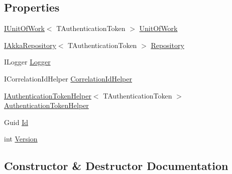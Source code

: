 \subsection*{Properties}
\begin{DoxyCompactItemize}
\item 
\hyperlink{interfaceCqrs_1_1Domain_1_1IUnitOfWork}{I\+Unit\+Of\+Work}$<$ T\+Authentication\+Token $>$ \hyperlink{classCqrs_1_1Akka_1_1Domain_1_1AkkaAggregateRoot_a58b79dc3e0d837e58d95f5cfeb2da9a1}{Unit\+Of\+Work}
\item 
\hyperlink{interfaceCqrs_1_1Akka_1_1Domain_1_1IAkkaRepository}{I\+Akka\+Repository}$<$ T\+Authentication\+Token $>$ \hyperlink{classCqrs_1_1Akka_1_1Domain_1_1AkkaAggregateRoot_aacd4e2569809e226326f7495f2c396a4}{Repository}
\item 
I\+Logger \hyperlink{classCqrs_1_1Akka_1_1Domain_1_1AkkaAggregateRoot_a685737862246db856bf3eb94345fca3f}{Logger}
\item 
I\+Correlation\+Id\+Helper \hyperlink{classCqrs_1_1Akka_1_1Domain_1_1AkkaAggregateRoot_ae1460c9574d7d7b1cb9de2848ae7102e}{Correlation\+Id\+Helper}
\item 
\hyperlink{interfaceCqrs_1_1Authentication_1_1IAuthenticationTokenHelper}{I\+Authentication\+Token\+Helper}$<$ T\+Authentication\+Token $>$ \hyperlink{classCqrs_1_1Akka_1_1Domain_1_1AkkaAggregateRoot_a3a73139fe47221bd579949e978d0126d}{Authentication\+Token\+Helper}
\item 
Guid \hyperlink{classCqrs_1_1Akka_1_1Domain_1_1AkkaAggregateRoot_ac03d79efc02629b17642c6324ff181c9}{Id}
\item 
int \hyperlink{classCqrs_1_1Akka_1_1Domain_1_1AkkaAggregateRoot_a4b526322c63542b1da2a700ff1b48d0c}{Version}
\end{DoxyCompactItemize}


\subsection{Constructor \& Destructor Documentation}
\mbox{\label{classCqrs_1_1Akka_1_1Domain_1_1AkkaAggregateRoot_a13b608db9231f1860a39fb5f43f485ba}} 
